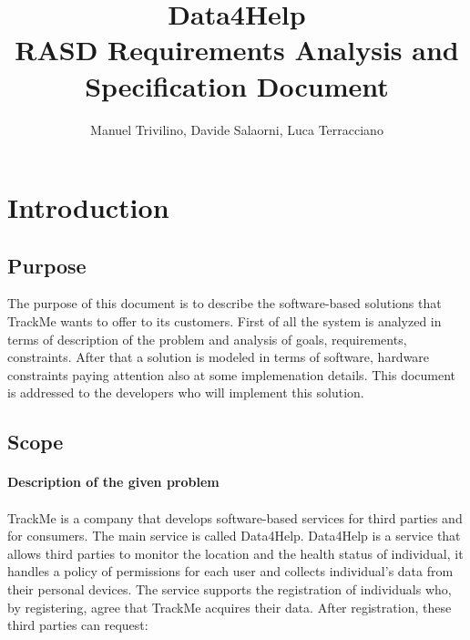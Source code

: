 \documentclass[a4paper]{article}
\begin{document}
    
    \author{Manuel Trivilino, Davide Salaorni, Luca Terracciano}
    
    \title{\Large Data4Help\\
    \Large RASD Requirements Analysis and Specification Document
    }
    
    \maketitle
    \newpage
    
    \tableofcontents
    \newpage
    
    \section{Introduction}
    
    \subsection{Purpose}
    The purpose of this document is to describe the software-based solutions that TrackMe wants to offer to its customers. First of all the system is analyzed in terms of description of the problem and analysis of goals, requirements, constraints. After that a solution is modeled in terms of software, hardware constraints paying attention also at some implemenation details. This document is addressed to the developers who will implement this solution.
    
    \subsection{Scope}
    
    \paragraph{Description of the given problem}
    
    \paragraph{}
    TrackMe is a company that develops software-based services for third parties and for consumers. The main service is called Data4Help.
     Data4Help is a service that allows third parties to monitor the location and the health status of individual, it handles a policy of permissions for each user and collects individual’s data from their personal devices.
    The service supports the registration of individuals who, by registering, agree that TrackMe acquires their data. After registration, these third parties can request:
    
\end{document}
